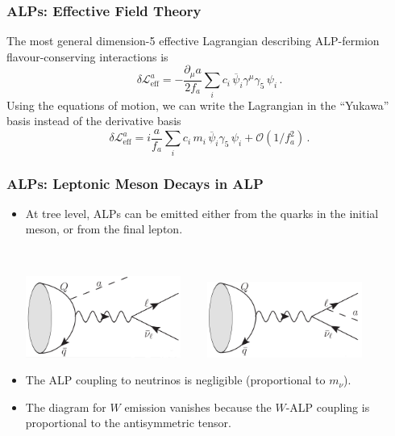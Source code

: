 \documentclass[mathserif, 10pt]{beamer}
\begin{document}
\begin{frame}\frametitle{ALPs: Effective Field Theory}
    The most general dimension-5 effective Lagrangian describing ALP-fermion flavour-conserving interactions is
    $$ \delta \mathcal{L}^{a}_{\mathrm{eff}} =
        -\frac{\partial_\mu a}{ 2 f_a} \sum_{i} c_i \,\overline{\psi}_i \gamma^\mu \gamma_5 \,\psi_i\,. $$
    Using the equations of motion, we can write the Lagrangian in the ``Yukawa'' basis instead of the derivative basis
    $$\delta \mathcal{L}^{a}_{\mathrm{eff}} = i \frac{a}{f_a} \sum_{i}  c_i\, m_i \, \overline{\psi}_i \gamma_5 \,\psi_i + \mathcal{O}(1/f_a^2) \,.$$
\end{frame}

\begin{frame}\frametitle{ALPs: Leptonic Meson Decays in ALP}
    \begin{itemize}
        \item At tree level, ALPs can be emitted either from the quarks in the initial meson, or from the final lepton.
              \vspace{0.5cm}

              ~

              {\centering
              \includegraphics[width=0.4\textwidth]{figures/Lept1.1}$\qquad$
              \includegraphics[width=0.4\textwidth]{figures/Lept1.3}}
              \vspace{0.5cm}
        \item The ALP coupling to neutrinos is negligible (proportional to $m_\nu$).
        \item The diagram for $W$ emission vanishes because the $W$-ALP coupling is proportional to the antisymmetric tensor.
    \end{itemize}
\end{frame}
\end{document}
